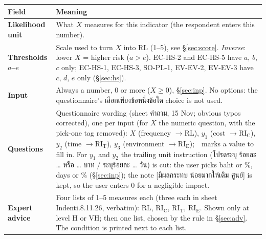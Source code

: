 \documentclass[10pt,a4paper]{article}
\newcommand{\RL}{\mathrm{RL}}\newcommand{\RIC}{\mathrm{RI_C}}\newcommand{\RIT}{\mathrm{RI_T}}\newcommand{\RIE}{\mathrm{RI_E}}
\newcommand{\blank}{\,\underline{\hspace{1.6em}}\,}
\begin{document}
\begin{tabularx}{\linewidth}{@{}>{\bfseries}p{3.2cm}X@{}}
\toprule
Field & Meaning\\\midrule
Likelihood unit & What $X$ measures for this indicator (the respondent enters this number).\\
Thresholds $a$--$e$ & Scale used to turn $X$ into $\RL$ (1--5), see §\ref{sec:score}. \emph{Inverse}: lower $X$ = higher risk ($a>e$). EC-HS-2 and EC-HS-5 have $a$, $b$, $c$ only; EC-HS-1, EC-HS-3, SO-PL-1, EV-EV-2, EV-EV-3 have $c$, $d$, $e$ only (§\ref{sec:hs}).\\
Input & Always a number, 0 or more ($X\ge0$), §\ref{sec:inp}. No options: the questionnaire's เลือกเพียงข้อหนึ่งข้อใด choice is not used.\\
Questions & Questionnaire wording (sheet คำถาม, 15 Nov; obvious typos corrected), one per input (for $X$ the numeric question, with the pick-one tag removed): $X$ (frequency $\to\RL$), $y_1$ (cost $\to\RIC$), $y_2$ (time $\to\RIT$), $y_3$ (environment $\to\RIE$); \blank{} marks a value to fill in. For $y_1$ and $y_2$ the trailing unit instruction (โปรดระบุ ร้อยละ … หรือ … บาท / ระบุร้อยละ … วัน) is cut: the user picks baht or \%, days or \% (§\ref{sec:inp}); the note [มีผลกระทบ น้อยมากให้เติม ศูนย์] is kept, so the user enters 0 for a negligible impact.\\
Expert advice & Four lists of 1--5 measures each (three each in sheet Indenti.8.11.26, verbatim): $\RL$, $\RIC$, $\RIT$, $\RIE$. Shown only at level H or VH; then one list, chosen by the rule in §\ref{sec:adv}. The condition is printed next to each list.\\
\bottomrule
\end{tabularx}
\end{document}
